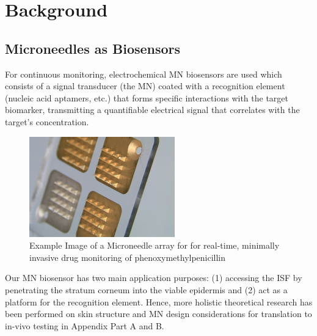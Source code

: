 \section{Background}
\vspace{-0.5cm}
\subsection{Microneedles as Biosensors}
\vspace{-0.5cm}
For continuous monitoring, electrochemical MN biosensors are used which consists of a signal transducer (the MN) coated with a recognition element (nucleic acid aptamers, etc.) that forms specific interactions with the target biomarker, transmitting a quantifiable electrical signal that correlates with the target’s concentration.
\begin{center}
    \begin{figure}[H]
    \centering
    \includegraphics[width=.4\textwidth]{img/microneedle_patch.png}
    \caption{Example Image of a Microneedle array for for real-time, minimally invasive drug monitoring of phenoxymethylpenicillin \cite{rawson2019microneedle}}
    \label{fig:microneedle}
\end{figure}
\end{center}
\vspace{-1cm}
Our MN biosensor has two main application purposes: (1) accessing the ISF by penetrating the stratum corneum into the viable epidermis and (2) act as a platform for the recognition element. Hence, more holistic theoretical research has been performed on skin structure and MN design considerations for translation to in-vivo testing in Appendix Part A and B.
